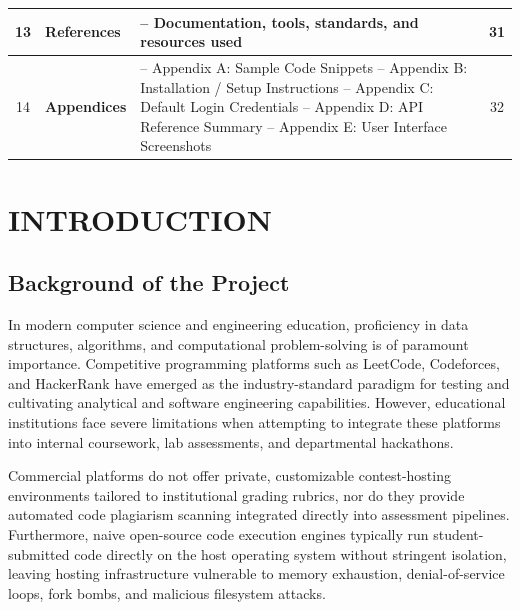 \documentclass[12pt,a4paper]{report}
\begin{document}
\begin{longtable}{|c|>{\raggedright\arraybackslash}p{3.2cm}|>{\raggedright\arraybackslash}p{7.8cm}|c|}
13 & \textbf{References} & -- Documentation, tools, standards, and resources used & 31 \\ \hline

14 & \textbf{Appendices} & 
-- Appendix A: Sample Code Snippets \newline 
-- Appendix B: Installation / Setup Instructions \newline 
-- Appendix C: Default Login Credentials \newline 
-- Appendix D: API Reference Summary \newline 
-- Appendix E: User Interface Screenshots & 32 \\ \hline

\end{longtable}

\clearpage

\setcounter{page}{5}
\pagestyle{fancy}
\thispagestyle{fancy}
\chapter{INTRODUCTION}

\section{Background of the Project}
In modern computer science and engineering education, proficiency in data structures, algorithms, and computational problem-solving is of paramount importance. Competitive programming platforms such as LeetCode, Codeforces, and HackerRank have emerged as the industry-standard paradigm for testing and cultivating analytical and software engineering capabilities. However, educational institutions face severe limitations when attempting to integrate these platforms into internal coursework, lab assessments, and departmental hackathons.

Commercial platforms do not offer private, customizable contest-hosting environments tailored to institutional grading rubrics, nor do they provide automated code plagiarism scanning integrated directly into assessment pipelines. Furthermore, naive open-source code execution engines typically run student-submitted code directly on the host operating system without stringent isolation, leaving hosting infrastructure vulnerable to memory exhaustion, denial-of-service loops, fork bombs, and malicious filesystem attacks. 
\end{document}
